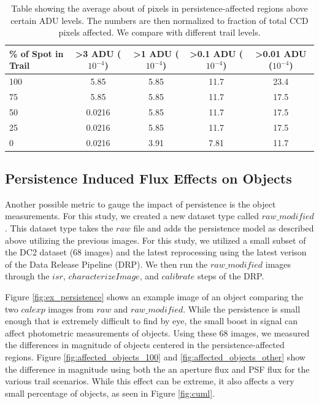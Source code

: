 \documentclass[DM,authoryear,toc]{lsstdoc}
\begin{document}
\begin{table}[h!]
\centering
\begin{tabular}{|lcccc|}
\hline
\% of Spot in Trail & >3 ADU ($10^{-4}$) & >1 ADU ($10^{-4}$) & >0.1 ADU ($10^{-4}$) & >0.01 ADU ($10^{-4}$) \\
\hline
100 & 5.85 & 5.85 & 11.7 & 23.4 \\
75 & 5.85 & 5.85 & 11.7 & 17.5 \\
50 & 0.0216 & 5.85 & 11.7 & 17.5 \\
25 & 0.0216 & 5.85 & 11.7 & 17.5 \\
0 & 0.0216 & 3.91 & 7.81 & 11.7 \\
\hline
\end{tabular}\label{tab:persis_affected}
\caption{Table showing the average about of pixels in persistence-affected regions above certain ADU levels. 
The numbers are then normalized to fraction of total CCD pixels affected.
We compare with different trail levels.
}  
\end{table}



\subsection{Persistence Induced Flux Effects on Objects}

Another possible metric to gauge the impact of persistence is the object measurements.
For this study, we created a new dataset type called \texttt{$raw\_modified$}. 
This dataset type takes the \texttt{$raw$} file and adds the persistence model as described above utilizing the previous images.
For this study, we utilized a small subset of the DC2 dataset (68 images) and the latest reprocessing using the latest verison of the Data Release Pipeline (DRP).
We then run the \texttt{$raw\_modified$} images through the \texttt{$isr$}, \texttt{$characterizeImage$}, and \texttt{$calibrate$} steps of the DRP\@. 

Figure \ref{fig:ex_persistence} shows an example image of an object comparing the two \texttt{$calexp$} images from \texttt{$raw$} and \texttt{$raw\_modified$}.
While the persistence is small enough that is extremely difficult to find by eye, the small boost in signal can affect photometric measurements of objects.
Using these 68 images, we measured the differences in magnitude of objects centered in the persistence-affected regions.
Figure \ref{fig:affected_objects_100} and \ref{fig:affected_objects_other} show the difference in magnitude using both the an aperture flux and PSF flux for the various trail scenarios.
While this effect can be extreme, it also affects a very small percentage of objects, as seen in Figure \ref{fig:cuml}.
\end{document}
